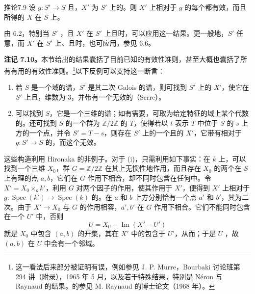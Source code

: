 \begin{SGAresult}{推论}{7.9}
设 $g:S'\to S$ 且，$X'$ 为 $S'$ 上的。则 $X'$ 上相对于 $g$ 的每个都有效，而且所得的 $X$ 在 $S$ 上。
\end{SGAresult}
由 6.2，特别当 $S'$ ，且 $X'$ 在 $S'$ 上且时，可以应用这一结果。更一般地，$S'$ 任意，而 $X'$ 在 $S'$ 上、且时，也可应用，参见 6.6。

\textbf{注记 7.10。}本节给出的结果囊括了目前已知的有效性准则，甚至大概也囊括了所有有用的有效性准则。\footnote{这一看法后来部分被证明有误，例如参见 J. P. Murre，Bourbaki 讨论班第 294 讲（附录），1965 年 5 月，以及若干特殊结果，特别是 Néron 与 Raynaud 的结果。的参见 M. Raynaud 的博士论文（1968 年）。}以下反例可以支持这一断言：

\begin{enumerate}[label=(\roman*)]
\item 若 $S$ 是一个域的谱，$S'$ 是其二次 Galois 的谱，则可找到 $S'$ 上的 $X'$，使它在 $S'$ 上且，维数为 $3$，并带有一个无效的（Serre）。
\item 可以找到 $S$，它是一个三维的谱；如有需要，可取为给定特征的域上某个代数的。还可找到 $S$ 的一个群为 $\mathbb Z/2\mathbb Z$ 的 $T$，使得若以 $t$ 表示 $T$ 中位于 $S$ 的 $s$ 上方的一个点，并令 $S'=T-s$，则存在 $S'$ 上的一个且的 $X'$，它带有相对于 $g:S'\to S$ 的，而这个无效。
\end{enumerate}
这些构造利用 Hironaka 的非例子。对于 (i)，只需利用如下事实：在 $k$ 上，可以找到一个三维 $X_0$，群 $G=\mathbb Z/2\mathbb Z$ 在其上无惯性地作用，而且存在 $X_0$ 的两个在 $S$ 上有理的点 $a,b$，它们在 $G$ 作用下相合，却不同时包含在任何中。令 $X'=X_0\times_k k'$，利用 $G$ 对两个因子的作用，使其作用于 $X'$，便得到 $X'$ 上相对于 $g:\operatorname{Spec}(k')\to\operatorname{Spec}(k)$ 的。在 $a$ 和 $b$ 上方分别恰有一个点 $a'$ 和 $b'$，其为二次。由于 $X'\to X_0$ 与 $G$ 的作用相容，$a',b'$ 在 $G$ 作用下相合。它们不能同时包含在一个 $U'$ 中，否则
\[
U=X_0-\operatorname{Im}(X'-U')
\]
就是 $X_0$ 中包含 $(a,b)$ 的开集，其在 $X'$ 中的包含于 $U'$，从而；于是 $U$ ，故 $(a,b)$ 在 $U$ 中会有一个邻域。

